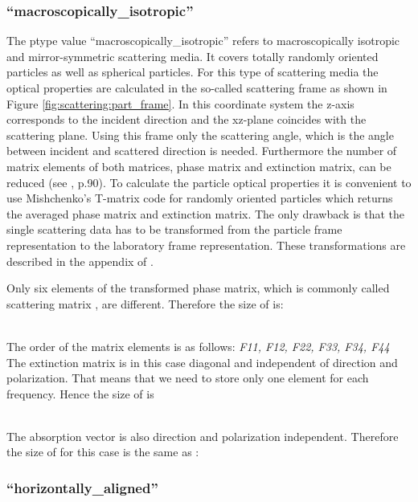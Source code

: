 \subsubsection{``macroscopically\_isotropic''}
The ptype value ``macroscopically\_isotropic'' refers to macroscopically
isotropic and mirror-symmetric scattering media. It covers totally randomly
oriented particles as well as spherical particles.
For this type of scattering media the optical properties are
calculated in the so-called scattering frame as shown in
Figure \ref{fig:scattering:part_frame}. In this coordinate 
system the z-axis corresponds to the incident direction and the
xz-plane coincides with the scattering plane. Using this frame only
the scattering angle, which is the angle between incident and
scattered direction is needed. Furthermore the number of matrix
elements of both matrices, phase matrix and extinction matrix, can be
reduced (see \citet{Mishchenko:02}, p.90). To calculate the
particle optical properties it is convenient to use Mishchenko's
T-matrix code for randomly oriented particles \citep{Mishchenko:98}
which returns the averaged phase matrix and extinction matrix. 
The only drawback is that the single scattering data has
to be transformed from the particle frame representation to the
laboratory frame representation. These transformations are described
in the appendix of \citet{emde05:_phdthesis}.

Only six elements of the transformed phase matrix, which is commonly
called scattering matrix \ScaMat, are different. Therefore the size of
 is: 

\shortcode{[N\_f N\_T N\_za\_sca 1 1 1 6]}\\
The order of the matrix elements is as follows: {\sl F11, F12, F22,
  F33, F34, F44}\\
The extinction matrix is in this case diagonal and independent of
direction and polarization. That means that we need to store only one
element for each frequency. Hence the size of
 is
 
\shortcode{[N\_f N\_T 1 1 1]}\\
The absorption vector is also direction and polarization
independent. Therefore the size of  for this
case is the same as : 

\shortcode{[N\_f N\_T 1 1 1]}

\subsubsection{``horizontally\_aligned''}

